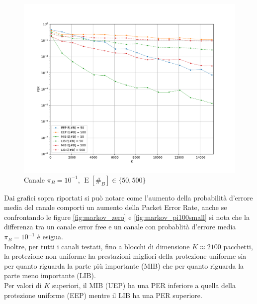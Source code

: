 \documentclass[italian, a4paper, 12pt]{article}
\newcommand{\E}[1]{\operatorname{E}\left[#1\right]}
\newcommand{\EnB}{\E{\#_B}}
\begin{document}
\begin{figure}[H]
  \centering
  \includegraphics[width=\textwidth]{plot_markov_pi10big}
  \caption{Canale $\pi_B = 10^{-1}$, $\EnB \in \{50, 500\}$}
  \label{fig:markov_pi10big}
\end{figure}
Dai grafici sopra riportati si può notare come l'aumento della probabilità d'errore
media del canale comporti un aumento della Packet Error Rate, anche se confrontando le
figure \ref{fig:markov_zero} e \ref{fig:markov_pi100small} si nota che la differenza tra un canale
error free e un canale con probablità d'errore media $\pi_B = 10^{-1}$ è esigua.\\
Inoltre, per tutti i canali testati, fino a blocchi di dimensione $K \approx 2100$ pacchetti, 
la protezione non uniforme ha
prestazioni migliori della protezione uniforme sia per quanto riguarda la
parte più importante (MIB) che per quanto riguarda la parte meno importante (LIB).\\
Per valori di $K$ superiori, il MIB (UEP) ha una PER inferiore a quella della protezione uniforme (EEP)
mentre il LIB ha una PER superiore.\\

%
%
\end{document}
